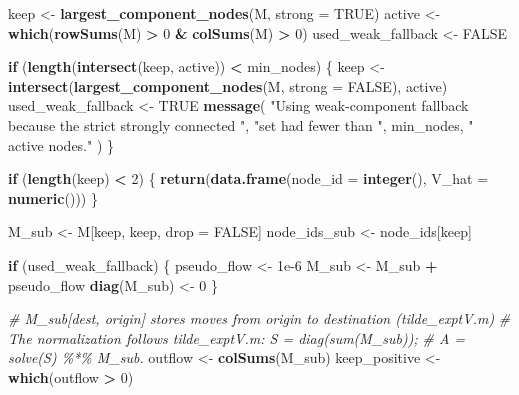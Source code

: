 \documentclass[
]{article}
\newenvironment{Shaded}{\begin{snugshade}}{\end{snugshade}}
\newcommand{\AttributeTok}[1]{\textcolor[rgb]{0.13,0.29,0.53}{#1}}
\newcommand{\CommentTok}[1]{\textcolor[rgb]{0.56,0.35,0.01}{\textit{#1}}}
\newcommand{\ConstantTok}[1]{\textcolor[rgb]{0.56,0.35,0.01}{#1}}
\newcommand{\ControlFlowTok}[1]{\textcolor[rgb]{0.13,0.29,0.53}{\textbf{#1}}}
\newcommand{\DecValTok}[1]{\textcolor[rgb]{0.00,0.00,0.81}{#1}}
\newcommand{\FloatTok}[1]{\textcolor[rgb]{0.00,0.00,0.81}{#1}}
\newcommand{\FunctionTok}[1]{\textcolor[rgb]{0.13,0.29,0.53}{\textbf{#1}}}
\newcommand{\NormalTok}[1]{#1}
\newcommand{\OtherTok}[1]{\textcolor[rgb]{0.56,0.35,0.01}{#1}}
\newcommand{\SpecialCharTok}[1]{\textcolor[rgb]{0.81,0.36,0.00}{\textbf{#1}}}
\newcommand{\StringTok}[1]{\textcolor[rgb]{0.31,0.60,0.02}{#1}}
\begin{document}
\begin{Shaded}
\begin{Highlighting}[]
\NormalTok{    keep }\OtherTok{\textless{}{-}} \FunctionTok{largest\_component\_nodes}\NormalTok{(M, }\AttributeTok{strong =} \ConstantTok{TRUE}\NormalTok{)}
\NormalTok{    active }\OtherTok{\textless{}{-}} \FunctionTok{which}\NormalTok{(}\FunctionTok{rowSums}\NormalTok{(M) }\SpecialCharTok{\textgreater{}} \DecValTok{0} \SpecialCharTok{\&} \FunctionTok{colSums}\NormalTok{(M) }\SpecialCharTok{\textgreater{}} \DecValTok{0}\NormalTok{)}
\NormalTok{    used\_weak\_fallback }\OtherTok{\textless{}{-}} \ConstantTok{FALSE}

    \ControlFlowTok{if}\NormalTok{ (}\FunctionTok{length}\NormalTok{(}\FunctionTok{intersect}\NormalTok{(keep, active)) }\SpecialCharTok{\textless{}}\NormalTok{ min\_nodes) \{}
\NormalTok{        keep }\OtherTok{\textless{}{-}} \FunctionTok{intersect}\NormalTok{(}\FunctionTok{largest\_component\_nodes}\NormalTok{(M, }\AttributeTok{strong =} \ConstantTok{FALSE}\NormalTok{), active)}
\NormalTok{        used\_weak\_fallback }\OtherTok{\textless{}{-}} \ConstantTok{TRUE}
        \FunctionTok{message}\NormalTok{(}
            \StringTok{"Using weak{-}component fallback because the strict strongly connected "}\NormalTok{,}
            \StringTok{"set had fewer than "}\NormalTok{, min\_nodes, }\StringTok{" active nodes."}
\NormalTok{        )}
\NormalTok{    \}}

    \ControlFlowTok{if}\NormalTok{ (}\FunctionTok{length}\NormalTok{(keep) }\SpecialCharTok{\textless{}} \DecValTok{2}\NormalTok{) \{}
        \FunctionTok{return}\NormalTok{(}\FunctionTok{data.frame}\NormalTok{(}\AttributeTok{node\_id =} \FunctionTok{integer}\NormalTok{(), }\AttributeTok{V\_hat =} \FunctionTok{numeric}\NormalTok{()))}
\NormalTok{    \}}

\NormalTok{    M\_sub }\OtherTok{\textless{}{-}}\NormalTok{ M[keep, keep, drop }\OtherTok{=} \ConstantTok{FALSE}\NormalTok{]}
\NormalTok{    node\_ids\_sub }\OtherTok{\textless{}{-}}\NormalTok{ node\_ids[keep]}

    \ControlFlowTok{if}\NormalTok{ (used\_weak\_fallback) \{}
\NormalTok{        pseudo\_flow }\OtherTok{\textless{}{-}} \FloatTok{1e{-}6}
\NormalTok{        M\_sub }\OtherTok{\textless{}{-}}\NormalTok{ M\_sub }\SpecialCharTok{+}\NormalTok{ pseudo\_flow}
        \FunctionTok{diag}\NormalTok{(M\_sub) }\OtherTok{\textless{}{-}} \DecValTok{0}
\NormalTok{    \}}

    \CommentTok{\# M\_sub[dest, origin] stores moves from origin to destination (tilde\_exptV.m)}
    \CommentTok{\# The normalization follows tilde\_exptV.m: S = diag(sum(M\_sub));}
    \CommentTok{\# A = solve(S) \%*\% M\_sub.}
\NormalTok{    outflow }\OtherTok{\textless{}{-}} \FunctionTok{colSums}\NormalTok{(M\_sub)}
\NormalTok{    keep\_positive }\OtherTok{\textless{}{-}} \FunctionTok{which}\NormalTok{(outflow }\SpecialCharTok{\textgreater{}} \DecValTok{0}\NormalTok{)}


\end{Highlighting}
\end{Shaded}
\end{document}
